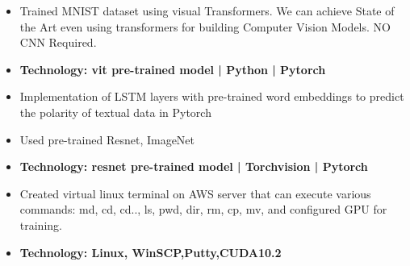 
\begin{itemize}
\item Trained MNIST dataset using visual Transformers. We can achieve State of the Art even using transformers for building Computer Vision Models. NO CNN Required.
\item\bf{Technology}{: vit pre-trained model | Python | Pytorch}
\end{itemize}
\smallskip
{}
\begin{itemize}
\item Implementation of LSTM layers with pre-trained word embeddings to predict the polarity of textual data in Pytorch
\end{itemize}
\smallskip
{}
\begin{itemize}
\item Used pre-trained Resnet, ImageNet
\item\bf{Technology}{: resnet pre-trained model | Torchvision | Pytorch}
\end{itemize}
\smallskip
{}
\begin{itemize}
\item Created virtual linux terminal on AWS server that can execute various commands: md, cd, cd.., ls, pwd, dir, rm, cp, mv, and configured GPU for training.
\item\bf{Technology}{: Linux, WinSCP,Putty,CUDA10.2}
\end{itemize}
